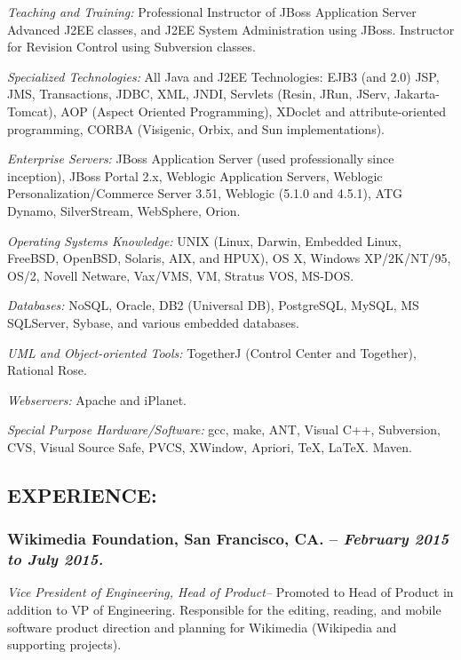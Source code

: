 \documentclass[10pt]{report}
\begin{document}
\begin{description}
\item{\emph{Teaching and Training:}} Professional Instructor of JBoss
Application Server Advanced J2EE classes, and J2EE System Administration using
JBoss.  Instructor for Revision Control using Subversion classes.

\item{\emph{Specialized Technologies:}} All Java and J2EE Technologies:  EJB3
(and 2.0)  JSP, JMS, Transactions, JDBC, XML, JNDI, Servlets (Resin, JRun,
JServ, Jakarta-Tomcat), AOP (Aspect Oriented Programming), XDoclet and
attribute-oriented programming, CORBA (Visigenic, Orbix, and Sun
implementations).

\item{\emph{Enterprise Servers:}} JBoss Application Server (used professionally
since inception), JBoss Portal 2.x, Weblogic Application Servers,  Weblogic
Personalization/Commerce Server 3.51, Weblogic (5.1.0 and 4.5.1), ATG Dynamo,
SilverStream, WebSphere, Orion.


\item{\emph{Operating Systems Knowledge:}} UNIX (Linux, Darwin, Embedded Linux,
FreeBSD, OpenBSD, Solaris, AIX, and HPUX), OS X,  Windows XP/2K/NT/95, OS/2,
Novell Netware, Vax/VMS, VM, Stratus VOS, MS-DOS.

\item{\emph{Databases:}} NoSQL, Oracle, DB2 (Universal DB), PostgreSQL, MySQL,
MS SQLServer, Sybase, and various embedded databases.

\item{\emph{UML and Object-oriented Tools:}} TogetherJ (Control Center and
Together), Rational Rose.

\item{\emph{Webservers:}} Apache and iPlanet.

\item{\emph{Special Purpose Hardware/Software:}} gcc, make, ANT, Visual C++,
Subversion, CVS, Visual Source Safe, PVCS, XWindow, Apriori, \TeX, \LaTeX.
Maven.


\end{description}

\subsection*{EXPERIENCE:}

\subsubsection*{Wikimedia Foundation, San Francisco, CA. -- \emph{February 2015
to July 2015. }} \emph{Vice President of Engineering, Head of Product--}
Promoted to Head of Product in addition to VP of Engineering.  Responsible for
the editing, reading, and mobile software product direction and planning for
Wikimedia (Wikipedia and supporting projects).
\end{document}
